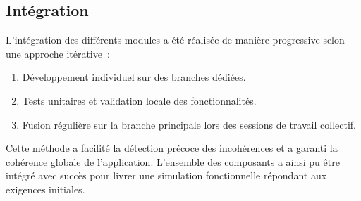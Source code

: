 \subsection{Intégration}

L'intégration des différents modules a été réalisée de manière progressive selon une approche itérative~:

\begin{enumerate}
    \item Développement individuel sur des branches dédiées.
    \item Tests unitaires et validation locale des fonctionnalités.
    \item Fusion régulière sur la branche principale lors des sessions de travail collectif.
\end{enumerate}

Cette méthode a facilité la détection précoce des incohérences et a garanti la cohérence globale de l'application. L'ensemble des composants a ainsi pu être intégré avec succès pour livrer une simulation fonctionnelle répondant aux exigences initiales.

